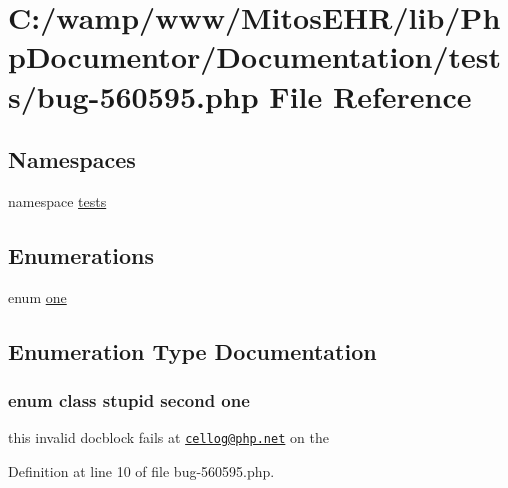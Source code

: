 \hypertarget{bug-560595_8php}{\section{\-C\-:/wamp/www/\-Mitos\-E\-H\-R/lib/\-Php\-Documentor/\-Documentation/tests/bug-\/560595.php \-File \-Reference}
\label{bug-560595_8php}
}
\subsection*{\-Namespaces}
\begin{DoxyCompactItemize}
\item 
namespace \hyperlink{namespacetests}{tests}
\end{DoxyCompactItemize}
\subsection*{\-Enumerations}
\begin{DoxyCompactItemize}
\item 
enum \hyperlink{bug-560595_8php_a249a0d27dbbbd8710b38705c030b2aef}{one} 
\end{DoxyCompactItemize}


\subsection{\-Enumeration \-Type \-Documentation}
\hypertarget{bug-560595_8php_a249a0d27dbbbd8710b38705c030b2aef}{
\subsubsection[{one}]{\setlength{\rightskip}{0pt plus 5cm}enum class stupid second {\bf one}}}\label{bug-560595_8php_a249a0d27dbbbd8710b38705c030b2aef}
this invalid docblock fails at \href{mailto:cellog@php.net}{\tt cellog@php.\-net} on the  

\-Definition at line 10 of file bug-\/560595.\-php.

